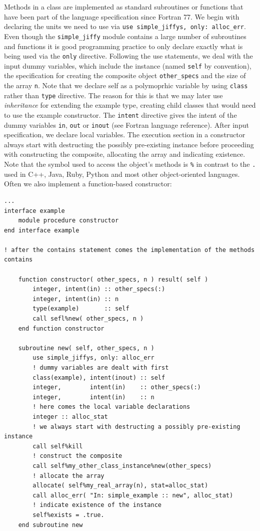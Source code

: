 \documentclass[a4paper,11pt]{article}
\begin{document}
Methods in a class are implemented as standard subroutines or functions that have been part of the language specification since Fortran 77. We begin with declaring the units we need to use via \texttt{use simple\_jiffys, only: alloc\_err}. Even though the \texttt{simple\_jiffy} module contains a large number of subroutines and functions it is good programming practice to only declare exactly what is being used via the \texttt{only} directive. Following the use statements, we deal with the input dummy variables, which include the instance (named \texttt{self} by convention), the specification for creating the composite object \texttt{other\_specs} and the size of the array \texttt{n}. Note that we declare self as a polymoprhic variable by using \texttt{class} rather than \texttt{type} directive. The reason for this is that we may later use \textit{inheritance} for extending the example type, creating child classes that would need to use the example constructor.  The \texttt{intent} directive gives the intent of the dummy variables \texttt{in}, \texttt{out} or \texttt{inout} (see Fortran language reference). After input specification, we declare local variables. The execution section in a constructor always start with destructing the possibly pre-existing instance before proceeding with constructing the composite, allocating the array and indicating existence. Note that the symbol used to access the object's methods is \texttt{\%} in contrast to the \texttt{.} used in C++, Java, Ruby, Python and most other object-oriented languages. Often we also implement a function-based constructor:
\begin{verbatim}
...
interface example
    module procedure constructor
end interface example

! after the contains statement comes the implementation of the methods
contains

    function constructor( other_specs, n ) result( self )
        integer, intent(in) :: other_specs(:)
        integer, intent(in) :: n
        type(example)       :: self
        call sefl%new( other_specs, n )
    end function constructor

    subroutine new( self, other_specs, n )
        use simple_jiffys, only: alloc_err
        ! dummy variables are dealt with first
        class(example), intent(inout) :: self
        integer,        intent(in)    :: other_specs(:)
        integer,        intent(in)    :: n
        ! here comes the local variable declarations
        integer :: alloc_stat
        ! we always start with destructing a possibly pre-existing instance
        call self%kill
        ! construct the composite
        call self%my_other_class_instance%new(other_specs)
        ! allocate the array
        allocate( self%my_real_array(n), stat=alloc_stat)
        call alloc_err( "In: simple_example :: new", alloc_stat)
        ! indicate existence of the instance
        self%exists = .true.
    end subroutine new
\end{verbatim}
\end{document}
